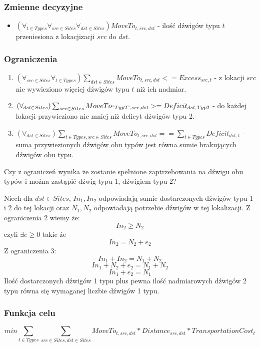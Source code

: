 \documentclass{article}
\begin{document}
\subsubsection{Zmienne decyzyjne}
\begin{itemize}
    \item $(\forall_{t \in Types} \forall_{src \in Sites} \forall_{dst \in Sites})MoveTo_{t,src,dst}$ - ilość dźwigów typu $t$ 
        przeniesiona z lokacjizacji $src$ do $dst$.
\end{itemize}

\subsubsection{Ograniczenia}
\begin{enumerate}
    \item $(\forall_{src \in Sites} \forall_{t \in Types}) \sum_{dst \in Sites} MoveTo_{t,src,dst} <= Excess_{src,t}$ -
        z lokacji $src$ nie wywieziono więciej dźwigów typu $t$ niż ich nadmiar.
    \item $(\forall_{dst \in Sites})\sum_{src \in Sites} MoveTo_{"Typ 2", src, dst} >= Deficit_{dst,Typ2}$ - do każdej
    lokacji przywieziono nie mniej niż deficyt dźwigów typu 2. 
    \item $(\forall_{dst \in Sites}) \sum_{t \in Types, src \in Sites} MoveTo_{t,src,dst} == \sum_{t \in Types} Deficit_{dst, t}$
        - suma przywiezionych dźwigów obu typów jest równa sumie brakujących dźwigów obu typu.
\end{enumerate}

Czy z ograniczeń wynika że zostanie spełnione zaptrzebowania na dźwigu obu typów i można zastąpić dźwig typu 1, dźwigiem typu 2?

Niech dla $dst \in Sites$, $In_1, In_2$ odpowiadają sumie dostarczonych dźwigów typu 1 i 2 do tej lokacji oraz $N_1, N_2$ odpowiadają
potrzebie dźwigów w tej lokalizacji. Z ograniczenia 2 wiemy że:
\[In_2 \ge N_2\]
czyli $\exists e \ge 0$ takie że
\[In_2 = N_2 + e_2\]
Z ograniczenia 3:
\[In_1 + In_2 = N_1 + N_2\]
\[In_1 + N_2 + e_2 = N_1 + N_2\]
\[In_1 + e_2 = N_1\]
Ilość dostarczonych dźwigów 1 typu plus pewna ilość nadmiarowych dźwigów 2 typu równa się wymaganej liczbie dźwigów 1 typu.

\subsubsection{Funkcja celu}

\[min \sum_{t \in Types} \sum_{src \in Sites, dst \in Sites} MoveTo_{t,src,dst} * Distance_{src,dst} * TransportationCost_{t}\]
\end{document}
